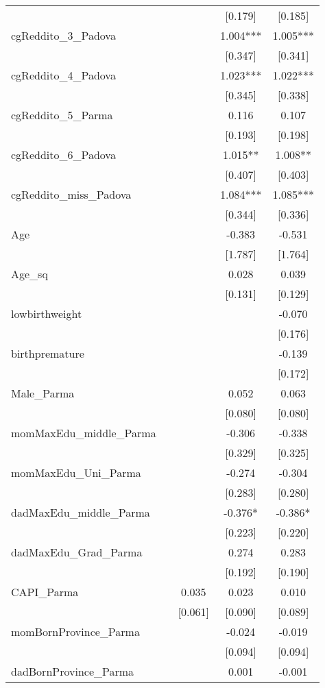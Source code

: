 \documentclass[]{article}
\begin{document}
\begin{tabular}{lcccc}
 &  &  & [0.179] & [0.185] \\
cgReddito\_3\_Padova &  &  & 1.004*** & 1.005*** \\
 &  &  & [0.347] & [0.341] \\
cgReddito\_4\_Padova &  &  & 1.023*** & 1.022*** \\
 &  &  & [0.345] & [0.338] \\
cgReddito\_5\_Parma &  &  & 0.116 & 0.107 \\
 &  &  & [0.193] & [0.198] \\
cgReddito\_6\_Padova &  &  & 1.015** & 1.008** \\
 &  &  & [0.407] & [0.403] \\
cgReddito\_miss\_Padova &  &  & 1.084*** & 1.085*** \\
 &  &  & [0.344] & [0.336] \\
Age &  &  & -0.383 & -0.531 \\
 &  &  & [1.787] & [1.764] \\
Age\_sq &  &  & 0.028 & 0.039 \\
 &  &  & [0.131] & [0.129] \\
lowbirthweight &  &  &  & -0.070 \\
 &  &  &  & [0.176] \\
birthpremature &  &  &  & -0.139 \\
 &  &  &  & [0.172] \\
Male\_Parma &  &  & 0.052 & 0.063 \\
 &  &  & [0.080] & [0.080] \\
momMaxEdu\_middle\_Parma &  &  & -0.306 & -0.338 \\
 &  &  & [0.329] & [0.325] \\
momMaxEdu\_Uni\_Parma &  &  & -0.274 & -0.304 \\
 &  &  & [0.283] & [0.280] \\
dadMaxEdu\_middle\_Parma &  &  & -0.376* & -0.386* \\
 &  &  & [0.223] & [0.220] \\
dadMaxEdu\_Grad\_Parma &  &  & 0.274 & 0.283 \\
 &  &  & [0.192] & [0.190] \\
CAPI\_Parma &  & 0.035 & 0.023 & 0.010 \\
 &  & [0.061] & [0.090] & [0.089] \\
momBornProvince\_Parma &  &  & -0.024 & -0.019 \\
 &  &  & [0.094] & [0.094] \\
dadBornProvince\_Parma &  &  & 0.001 & -0.001 \\

\end{tabular}
\end{document}

